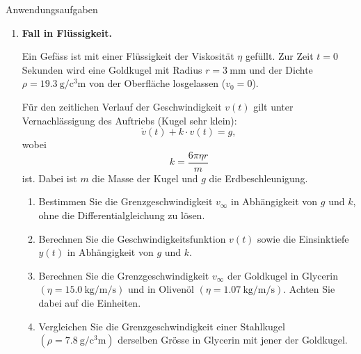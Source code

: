 \begin{ueb}{Anwendungsaufgaben}{}
\begin{enumerate}

        \item \textbf{Fall in Flüssigkeit.}

              Ein Gefäss ist mit einer Flüssigkeit der Viskosität \(\eta\) gefüllt.
              Zur Zeit \(t=0\) Sekunden wird eine Goldkugel mit Radius
              \(r=\SI{3}{\milli\meter}\) und der Dichte
              \(\rho=\SI{19.3}{\gram\per\cubic\centi\meter}\)
              von der Oberfläche losgelassen (\(v_0=0\)).

              Für den zeitlichen Verlauf der Geschwindigkeit \(v(t)\) gilt unter
              Vernachlässigung des Auftriebs (Kugel sehr klein):
              \[
                  \dot v(t)+k\cdot v(t)=g,
              \]
              wobei
              \[
                  k=\frac{6\pi\eta r}{m}
              \]
              ist. Dabei ist \(m\) die Masse der Kugel und \(g\) die
              Erdbeschleunigung.

              \begin{enumerate}
                  \item Bestimmen Sie die Grenzgeschwindigkeit \(v_\infty\) in
                        Abhängigkeit von \(g\) und \(k\), ohne die
                        Differentialgleichung zu lösen.

                  \item Berechnen Sie die Geschwindigkeitsfunktion \(v(t)\)
                        sowie die Einsinktiefe \(y(t)\) in Abhängigkeit von
                        \(g\) und \(k\).

                  \item Berechnen Sie die Grenzgeschwindigkeit \(v_\infty\)
                        der Goldkugel in Glycerin
                        \(\left(\eta=\SI{15.0}{\kilogram\per\meter\per\second}\right)\)
                        und in Olivenöl
                        \(\left(\eta=\SI{1.07}{\kilogram\per\meter\per\second}\right)\).
                        Achten Sie dabei auf die Einheiten.

                  \item Vergleichen Sie die Grenzgeschwindigkeit einer Stahlkugel
                        \(\left(\rho=\SI{7.8}{\gram\per\cubic\centi\meter}\right)\)
                        derselben Grösse in Glycerin mit jener der Goldkugel.
              \end{enumerate}



\end{enumerate}
\end{ueb}
